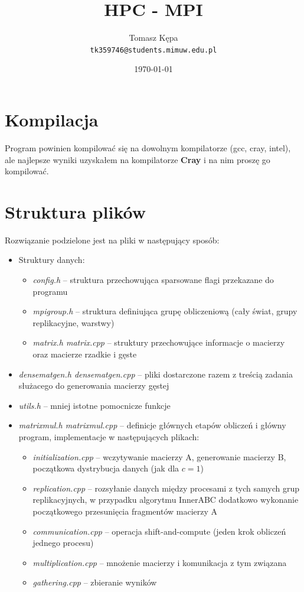 \documentclass{article}
\date\today
\title{HPC - MPI}
\author{Tomasz Kępa \\ \texttt{tk359746@students.mimuw.edu.pl}}
\begin{document}
\maketitle

\section{Kompilacja}
Program powinien kompilować się na dowolnym kompilatorze (gcc, cray, intel), ale najlepsze wyniki uzyskałem na kompilatorze
\textbf{Cray} i na nim proszę go kompilować.

\section{Struktura plików}
Rozwiązanie podzielone jest na pliki w następujący sposób:
\begin{itemize}
  \item Struktury danych:
    \begin{itemize}
       \item \emph{config.h} -- struktura przechowująca sparsowane flagi przekazane do programu
       \item \emph{mpigroup.h} -- struktura definiująca grupę obliczeniową (cały świat, grupy replikacyjne, warstwy)
       \item \emph{matrix.h matrix.cpp} -- struktury przechowujące informacje o macierzy oraz macierze rzadkie i gęste
    \end{itemize}
  \item \emph{densematgen.h densematgen.cpp} -- pliki dostarczone razem z treścią zadania służacego do generowania macierzy gęstej
  \item \emph{utils.h} -- mniej istotne pomocnicze funkcje
  \item \emph{matrixmul.h matrixmul.cpp} -- definicje głównych etapów obliczeń i główny program, implementacje w następujących plikach:
    \begin{itemize}
      \item \emph{initialization.cpp} -- wczytywanie macierzy A, generowanie macierzy B, początkowa dystrybucja danych (jak dla $c=1$)
      \item \emph{replication.cpp} -- rozsyłanie danych między procesami z tych samych grup replikacyjnych, w przypadku algorytmu InnerABC
                                                         dodatkowo wykonanie początkowego przesunięcia fragmentów macierzy A
      \item \emph{communication.cpp} -- operacja shift-and-compute (jeden krok obliczeń jednego procesu)
      \item \emph{multiplication.cpp} -- mnożenie macierzy i komunikacja z tym związana
      \item \emph{gathering.cpp} -- zbieranie wyników
    \end{itemize}
\end{itemize}
\end{document}

